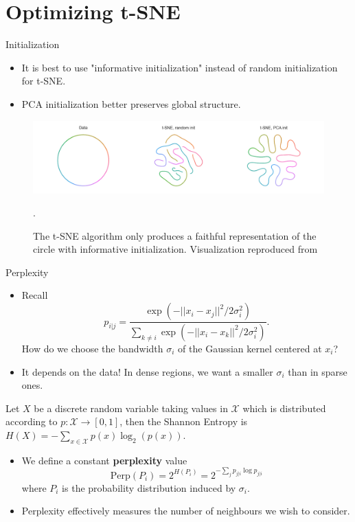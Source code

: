 \section{Optimizing t-SNE}

\begin{frame}{Initialization}
    \begin{itemize}
        \item It is best to use "informative initialization" instead of random initialization for t-SNE. 
        \item PCA initialization better preserves global structure.  
    \end{itemize}
    \begin{figure}
        \centering
        \includegraphics[width=\textwidth]{tsne-circle.png}
        \caption{The t-SNE algorithm only produces a faithful representation of the circle with informative initialization. Visualization reproduced from \cite{kl2021}}. 
    \end{figure} 
\end{frame}

\begin{frame}{Perplexity}
    \begin{itemize}
        \item Recall \[p_{i|j} = \frac{\exp(-||x_i-x_j||^2/2\sigma_i^2)}{\sum_{k\neq i} \exp (- ||x_i - x_k||^2/2\sigma_i^2)}.\] How do we choose the bandwidth $\sigma_i$ of the Gaussian kernel centered at $x_i$? \pause
        \item It depends on the data! In dense regions, we want a smaller $\sigma_i$ than in sparse ones.  \pause 
    \end{itemize}
    \begin{definition}
        Let $X$ be a discrete random variable taking values in $\mathcal{X}$ which is distributed according to $p: \mathcal{X} \to [0,1]$, then the Shannon Entropy is $H(X) = - \sum_{x \in \mathcal{X}} p(x) \log_2 (p(x))$.
    \end{definition}
    \begin{itemize}
        \item We define a constant \textbf{perplexity} value 
        \[ \text{Perp}(P_i) = 2^{H(P_i)} = 2^{-\sum_{j} p_{j|i} \log p_{j|i}}\] where $P_i$ is the probability distribution induced by $\sigma_i$. \pause
        \item Perplexity effectively measures the number of neighbours we wish to consider.  
    \end{itemize}
\end{frame}

